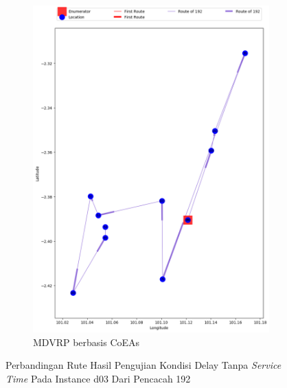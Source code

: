 \begin{figure}[H]
	\centering
	\begin{subfigure}[t]{\textwidth}
		\centering
		\includegraphics[width=\textwidth]{Resources/Images/delayed_3/real_m15_n100_delayed_3_192_coes}
		\caption{MDVRP berbasis CoEAs}
		\label{fig:real_m15_n100_delayed_3_192_coes}
	\end{subfigure}
	\caption{Perbandingan Rute Hasil Pengujian Kondisi Delay Tanpa \textit{Service Time} Pada Instance d03 Dari Pencacah 192}
	\label{fig:real_m15_n100_delayed_3_192}
\end{figure}


